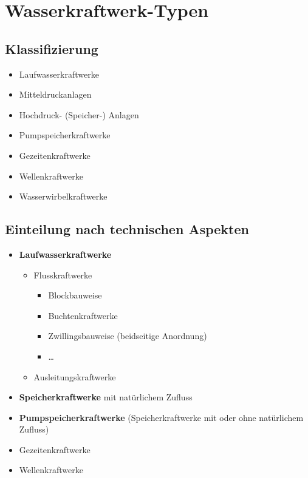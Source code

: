 \newpage
\section{Wasserkraftwerk-Typen}

\subsection{Klassifizierung}

\begin{itemize}
    \item Laufwasserkraftwerke
    \item Mitteldruckanlagen
    \item Hochdruck- (Speicher-) Anlagen
    \item Pumpspeicherkraftwerke
    \item Gezeitenkraftwerke
    \item Wellenkraftwerke
    \item Wasserwirbelkraftwerke
\end{itemize}


\subsection{Einteilung nach technischen Aspekten}
\begin{itemize}
    \item \textbf{Laufwasserkraftwerke}
    \begin{itemize}
        \item Flusskraftwerke
        \begin{itemize}
            \item Blockbauweise
            \item Buchtenkraftwerke
            \item Zwillingsbauweise (beidseitige Anordnung)
            \item \dots
        \end{itemize}
        \item Ausleitungskraftwerke
    \end{itemize}
    
    \item \textbf{Speicherkraftwerke} mit natürlichem Zufluss
    \item \textbf{Pumpspeicherkraftwerke} (Speicherkraftwerke mit oder ohne natürlichem Zufluss)
    \item Gezeitenkraftwerke
    \item Wellenkraftwerke
\end{itemize}




